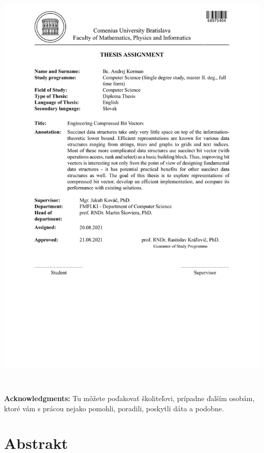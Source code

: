 \documentclass[12pt, twoside]{book}
\begin{document}
\hspace{-2cm}\includegraphics[width=1.1\textwidth]{images/zadanie-en}


\frontmatter

\setcounter{page}{3}
\newpage 
~

\vfill
{\bf Acknowledgments:} Tu môžete poďakovať školiteľovi, prípadne
ďalším osobám, ktoré vám s prácou nejako pomohli, poradili,
poskytli dáta a podobne.


\newpage 
\section*{Abstrakt}
\end{document}
